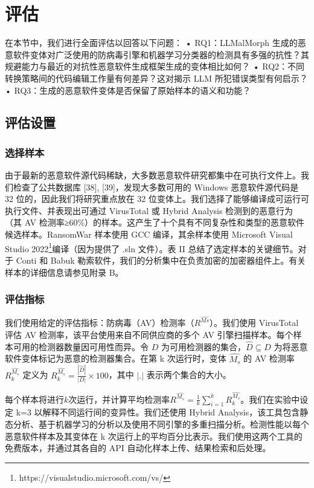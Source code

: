 \chapter{评估}
在本节中，我们进行全面评估以回答以下问题：
• RQ1：LLMalMorph 生成的恶意软件变体对广泛使用的防病毒引擎和机器学习分类器的检测具有多强的抗性？其规避能力与最近的对抗性恶意软件生成框架生成的变体相比如何？
• RQ2：不同转换策略间的代码编辑工作量有何差异？这对揭示 LLM 所犯错误类型有何启示？
• RQ3：生成的恶意软件变体是否保留了原始样本的语义和功能？

\section{评估设置}

\subsection{选择样本}
由于最新的恶意软件源代码稀缺，大多数恶意软件研究都集中在可执行文件上。我们检查了公共数据库 [38], [39]，发现大多数可用的 Windows 恶意软件源代码是 32 位的，因此我们将研究重点放在 32 位变体上。我们选择了能够编译成可运行可执行文件、并表现出可通过 VirusTotal 或 Hybrid Analysis 检测到的恶意行为（其 AV 检测率≥60\%）的样本。这产生了十个具有不同复杂性和类型的恶意软件候选样本。RansomWar 样本使用 GCC 编译，其余样本使用 Microsoft Visual Studio 2022\footnote{https://visualstudio.microsoft.com/vs/}编译（因为提供了 .sln 文件）。表 II 总结了选定样本的关键细节。对于 Conti 和 Babuk 勒索软件，我们的分析集中在负责加密的加密器组件上。有关样本的详细信息请参见附录 B。

\subsection{评估指标}
我们使用给定的评估指标：防病毒（AV）检测率（$R^{\hat{Ms}}$）。我们使用 VirusTotal 评估 AV 检测率，该平台使用来自不同供应商的多个 AV 引擎扫描样本。每个样本可用的检测器数量因可用性而异。令 $D$ 为可用检测器的集合，$\hat{D} \subseteq D$ 为将恶意软件变体标记为恶意的检测器集合。在第 k 次运行时，变体 $\hat{M_{s}}$ 的 AV 检测率 $R^{\hat{M_{s}}}_{k}$ 定义为 $R^{\hat{M_{s}}}_{k} = \frac{|\hat{D}|}{|D|} \times 100$，其中 $|.|$ 表示两个集合的大小。

每个样本将进行$k$次运行，并计算平均检测率$R^{\hat{M_{s}}}=\frac{1}{k} \sum_{i=1}^{k} R_{k}^{\hat{M_{s}}}$。我们在实验中设定 k=3 以解释不同运行间的变异性。我们还使用 Hybrid Analysis，该工具包含静态分析、基于机器学习的分析以及使用不同引擎的多重扫描分析。检测性能以每个恶意软件样本及其变体在 k 次运行上的平均百分比表示。我们使用这两个工具的免费版本，并通过其各自的 API 自动化样本上传、结果检索和后处理。

